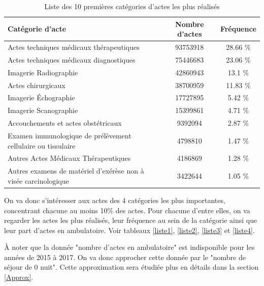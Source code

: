 \begin{table}[!ht]
\centering
\caption{Liste des 10 premières catégories d'actes les plus réalisés}
\begin{tabular}{l|cc}
  \hline
Catégorie d'acte & Nombre d'actes & Fréquence \\ 
  \hline
Actes techniques médicaux thérapeutiques & 93753918 & 28.66 \% \\ 
  Actes techniques médicaux diagnostiques & 75446683 & 23.06 \% \\ 
  Imagerie Radiographie & 42860943 & 13.1 \% \\ 
  Actes chirurgicaux & 38700959 & 11.83 \% \\ 
  Imagerie Échographie & 17727895 & 5.42 \% \\ 
  Imagerie Scanographie & 15399861 & 4.71 \% \\ 
  Accouchements et actes obstétricaux & 9392094 & 2.87 \% \\ 
  Examen immunologique de prélèvement cellulaire ou tissulaire & 4798810 & 1.47 \% \\ 
  Autres Actes Médicaux Thérapeutiques & 4186869 & 1.28 \% \\ 
  Autres examens de matériel d'exérèse non à visée carcinologique & 3422644 & 1.05 \% \\ 
   \hline
\end{tabular}
\end{table}


On va donc s'intéresser aux actes des 4 catégories les plus importantes, concentrant chacune au moins 10\% des actes. Pour chacune d'entre elles, on va regarder les actes les plus réalisés, leur fréquence au sein de la catégorie ainsi que leur part d'actes en ambulatoire. Voir tableaux \ref{liste1}, \ref{liste2}, \ref{liste3} et \ref{liste4}.

\`{A} noter que la donnée "nombre d'actes en ambulatoire" est indisponible pour les années de 2015 à 2017. On va donc approcher cette donnée par le "nombre de séjour de 0 nuit". Cette approximation sera étudiée plus en détails dans la section \ref{Approx}.\\


